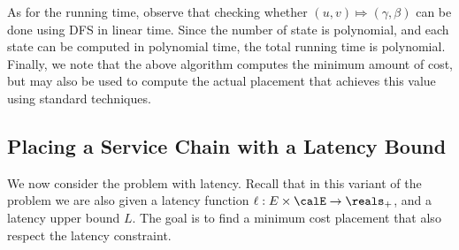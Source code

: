As for the running time, observe that checking whether $(u, v) \Mapsto
(\gamma,\beta)$ can be done using DFS in linear time.
%
Since the number of state is polynomial, and each state can be
computed in polynomial time, the total running time is polynomial.
Finally, we note that the above algorithm computes the minimum amount
of cost, but may also be used to compute the actual placement
that achieves this value using standard techniques.


\subsection{Placing a Service Chain with a Latency Bound}
\label{sub:DPL}

We now consider the \scp problem with latency.  Recall that in this
variant of the problem we are also given a latency function $\ell: E
\times \calE \to \reals_+$, and a latency upper bound $L$.  The goal
is to find a minimum cost placement that also respect the latency
constraint.


